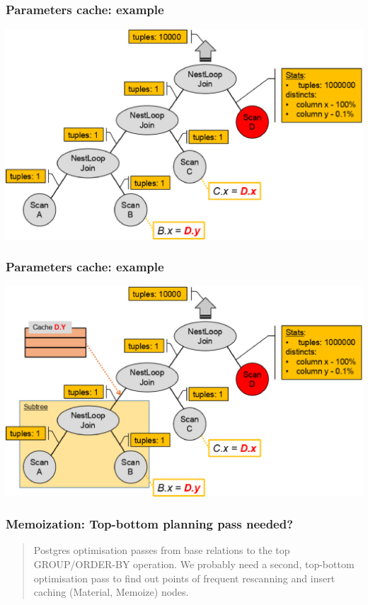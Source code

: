 \documentclass{beamer}
\begin{document}
\begin{frame}\frametitle{Parameters cache: example}
\hspace*{\fill}
	\includegraphics[scale=0.5]{pics/spool_example_1}
\hspace*{\fill}
\end{frame}

\begin{frame}\frametitle{Parameters cache: example}
\hspace*{\fill}
	\includegraphics[scale=0.5]{pics/spool_example_2}
\hspace*{\fill}
\end{frame}

\begin{frame}\frametitle{Memoization: Top-bottom planning pass needed?}
\begin{quote}
Postgres optimisation passes from base relations to the top GROUP/ORDER-BY operation. We probably need a second, top-bottom optimisation pass to find out points of frequent rescanning and insert caching (Material, Memoize) nodes.
\end{quote}
\end{frame}
\end{document}
